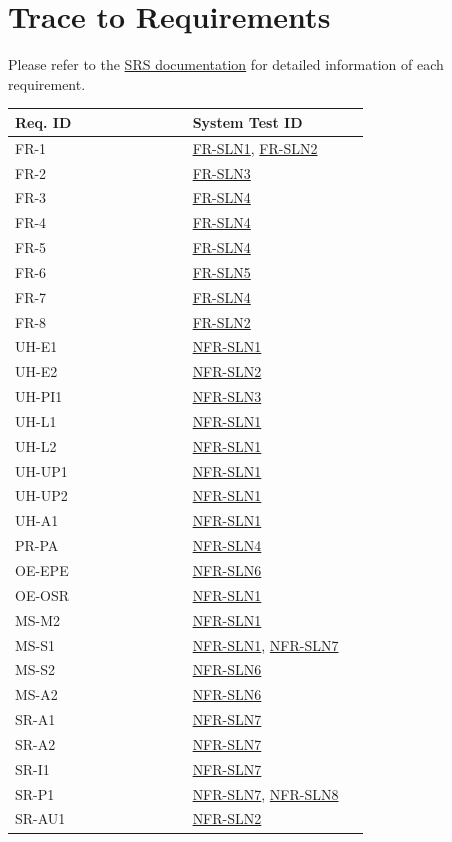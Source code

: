 \documentclass[12pt, titlepage]{article}
\begin{document}
\section{Trace to Requirements}
Please refer to the \href{https://github.com/TPGEngine/tpg/blob/main/docs/SRS/SRS.pdf}{SRS documentation} \citep{SRS} for detailed information of each requirement.
\begin{longtable}{|p{0.45\linewidth}|p{0.45\linewidth}|}
\hline
\textbf{Req. ID} & \textbf{System Test ID} \\
\hline
FR-1 & \hyperref[mujoco_integration]{FR-SLN1}, \hyperref[mujoco_integration]{FR-SLN2} \\
\hline
FR-2 & \hyperref[experiment_visualization]{FR-SLN3} \\
\hline
FR-3 & \hyperref[github_actions]{FR-SLN4} \\
\hline
FR-4 & \hyperref[github_actions]{FR-SLN4} \\
\hline
FR-5 & \hyperref[github_actions]{FR-SLN4} \\
\hline
FR-6 & \hyperref[software_engineering_practices]{FR-SLN5} \\
\hline
FR-7 & \hyperref[github_actions]{FR-SLN4} \\
\hline
FR-8 & \hyperref[mujoco_integration]{FR-SLN2} \\
\hline
UH-E1 & \hyperref[usability]{NFR-SLN1} \\
\hline
UH-E2 & \hyperref[usability]{NFR-SLN2} \\
\hline
UH-PI1 & \hyperref[usability]{NFR-SLN3} \\
\hline
UH-L1 & \hyperref[usability]{NFR-SLN1} \\
\hline
UH-L2 & \hyperref[usability]{NFR-SLN1} \\
\hline
UH-UP1 & \hyperref[usability]{NFR-SLN1} \\
\hline
UH-UP2 & \hyperref[usability]{NFR-SLN1} \\
\hline
UH-A1 & \hyperref[usability]{NFR-SLN1} \\
\hline
PR-PA & \hyperref[performance]{NFR-SLN4} \\
\hline
OE-EPE & \hyperref[operational]{NFR-SLN6} \\
\hline
OE-OSR & \hyperref[usability]{NFR-SLN1} \\
\hline
MS-M2 & \hyperref[usability]{NFR-SLN1} \\
\hline
MS-S1 & \hyperref[usability]{NFR-SLN1}, \hyperref[maintainability]{NFR-SLN7} \\
\hline
MS-S2 & \hyperref[operational]{NFR-SLN6} \\
\hline
MS-A2 & \hyperref[operational]{NFR-SLN6} \\
\hline
SR-A1 & \hyperref[maintainability]{NFR-SLN7} \\
\hline
SR-A2 & \hyperref[maintainability]{NFR-SLN7} \\
\hline
SR-I1 & \hyperref[maintainability]{NFR-SLN7} \\
\hline
SR-P1 & \hyperref[maintainability]{NFR-SLN7}, \hyperref[security]{NFR-SLN8} \\
\hline
SR-AU1 & \hyperref[usability]{NFR-SLN2} \\
\hline
\end{longtable}
		
\end{document}
